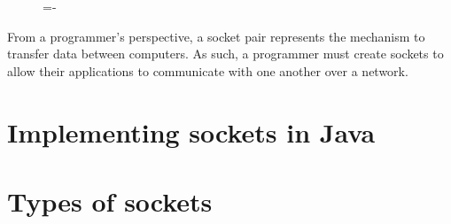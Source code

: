 \documentclass[a4paper]{systems-software}
\begin{document}
\begin{figure}[H]
	\lineskip=-\fboxrule
\end{figure}

From a programmer's perspective, a socket pair represents the mechanism to transfer data between computers. As such, a programmer must create sockets to allow their applications to communicate with one another over a network.


\newpage

\section{Implementing sockets in Java}
\label{chap:13}

\section*{Types of sockets}
\end{document}
